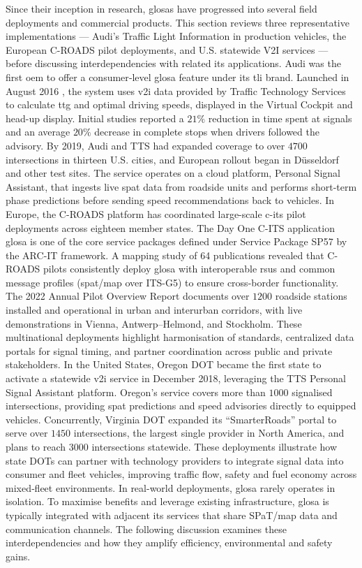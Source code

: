Since their inception in research, \acp{glosa} have progressed into several field deployments and commercial products. This section reviews three representative implementations --- Audi’s Traffic Light Information in production vehicles, the European C-ROADS pilot deployments, and U.S. statewide V2I services --- before discussing interdependencies with related \ac{its} applications.
\mynewline
Audi was the first \ac{oem} to offer a consumer‐level \ac{glosa} feature under its \ac{tli} brand. Launched in August 2016 \cite{AudiV2I2016}, the system uses \ac{v2i} data provided by Traffic Technology Services to calculate \ac{ttg} and optimal driving speeds, displayed in the Virtual Cockpit and head-up display. Initial studies reported a $21\%$ reduction in time spent at signals and an average $20\%$ decrease in complete stops when drivers followed the advisory. \cite{AudiTechTalk} By 2019, Audi and TTS had expanded coverage to over $4700$ intersections in thirteen U.S. cities, and European rollout began in Düsseldorf and other test sites. The service operates on a cloud platform, Personal Signal Assistant, that ingests live \ac{spat} data from roadside units and performs short‐term phase predictions before sending speed recommendations back to vehicles. \cite{TTS2019}
In Europe, the C-ROADS platform has coordinated large-scale \ac{c-its} pilot deployments across eighteen member states. The Day One C-ITS application \ac{glosa} is one of the core service packages defined under Service Package SP57 by the ARC-IT framework. \cite{ARCITSP57} A mapping study of 64 publications revealed that C-ROADS pilots consistently deploy \ac{glosa} with interoperable \acp{rsu} and common message profiles (\ac{spat}/\ac{map} over ITS-G5) to ensure cross-border functionality. \cite{Mellegard2020} The 2022 Annual Pilot Overview Report documents over $1200$ roadside stations installed and operational in urban and interurban corridors, with live demonstrations in Vienna, Antwerp–Helmond, and Stockholm. \cite{CROADSPilot2022} These multinational deployments highlight harmonisation of standards, centralized data portals for signal timing, and partner coordination across public and private stakeholders.
In the United States, Oregon DOT became the first state to activate a statewide \ac{v2i} service in December 2018, leveraging the TTS Personal Signal Assistant platform. Oregon’s service covers more than $1000$ signalised intersections, providing \ac{spat} predictions and speed advisories directly to equipped vehicles. Concurrently, Virginia DOT expanded its \enquote{SmarterRoads} portal to serve over $1450$ intersections, the largest single provider in North America, and plans to reach $3000$ intersections statewide. \cite{TTS2019} These deployments illustrate how state DOTs can partner with technology providers to integrate signal data into consumer and fleet vehicles, improving traffic flow, safety and fuel economy across mixed‐fleet environments.
\mynewline
In real-world deployments, \ac{glosa} rarely operates in isolation. To maximise benefits and leverage existing infrastructure, \ac{glosa} is typically integrated with adjacent \ac{its} services that share SPaT/\ac{map} data and communication channels. The following discussion examines these interdependencies and how they amplify efficiency, environmental and safety gains.

